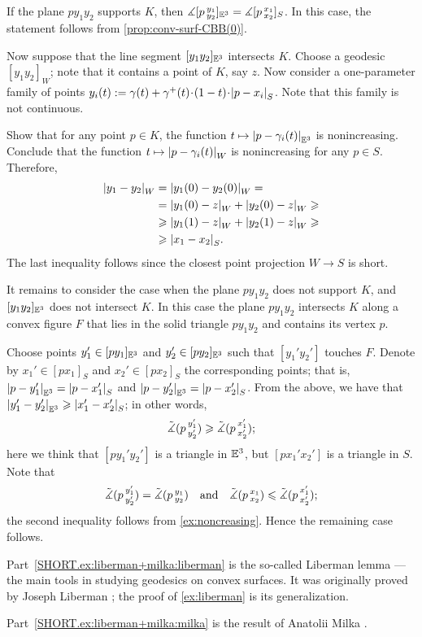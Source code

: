 If the plane $py_1y_2$ supports $K$, then 
$\measuredangle[p\,{}^{y_1}_{y_2}]_{\mathbb{E}^3}=\measuredangle[p\,{}^{x_1}_{x_2}]_S$.
In this case, the statement follows from \ref{prop:conv-surf-CBB(0)}.

Now suppose that the line segment $[y_1y_2]_{\mathbb{E}^3}$ intersects $K$.
Choose a geodesic $[y_1y_2]_W$;
note that it contains a point of $K$, say $z$.
Now consider a one-parameter family of points 
$y_i(t)\df \gamma(t)+\gamma^+(t)\cdot (1-t)\cdot \dist{p}{x_i}{S}$.
Note that this family is not continuous.

Show that for any point $p\in K$, the function $t\mapsto |{p}-{\gamma_i(t)}|_{\mathbb{E}^3}^{{}}$ is nonincreasing.
Conclude that the function $t\mapsto |{p}-{\gamma_i(t)}|_{W}^{{}}$ is nonincreasing for any $p\in S$.
Therefore, 
\begin{align*}
|{y_1}-{y_2}|_{W}^{{}}
&=|{y_1(0)}-{y_2(0)}|_{W}^{{}}=
\\
&=|{y_1(0)}-{z}|_{W}^{{}}+|{y_2(0)}-{z}|_{W}^{{}}\geqslant
\\
&\geqslant|{y_1(1)}-{z}|_{W}^{{}}+|{y_2(1)}-{z}|_{W}^{{}}\geqslant 
\\
&\geqslant|{x_1}-{x_2}|_{S}^{{}}.
\end{align*}
The last inequality follows since the closest point projection $W\to S$ is short.

It remains to consider the case when the plane $py_1y_2$ does not support $K$,
and $[y_1y_2]_{\mathbb{E}^3}$ does not intersect $K$.
In this case the plane $py_1y_2$ intersects $K$ along a convex figure $F$ that lies in the solid triangle 
$py_1y_2$ and contains its vertex $p$.

Choose points $y_1'\in [py_1]_{\mathbb{E}^3}$ and $y_2'\in [py_2]_{\mathbb{E}^3}$ such that $[y_1'y_2']$ touches $F$.
Denote by $x_1'\in [px_1]_{S}$ and $x_2'\in [px_2]_{S}$ the corresponding points;
that is, $|{p}-{y_1'}|_{\mathbb{E}^3}^{{}}=|{p}-{x_1'}|_{S}^{{}}$ and $|{p}-{y_2'}|_{\mathbb{E}^3}^{{}}=|{p}-{x_2'}|_{S}^{{}}$.
From the above, we have that $|{y_1'}-{y_2'}|_{\mathbb{E}^3}^{{}}\geqslant|{x_1'}-{x_2'}|_{S}^{{}}$;
in other words, 
\[\tilde\measuredangle(p\,{}^{y_1'}_{y_2'})\geqslant \tilde\measuredangle(p\,{}^{x_1'}_{x_2'});\]
here we think that $[p{y_1'}{y_2'}]$ is a triangle in $\mathbb{E}^3$, but $[p{x_1'}{x_2'}]$ is a triangle in $S$.
Note that 
\[\tilde\measuredangle(p\,{}^{y_1'}_{y_2'})=\tilde\measuredangle(p\,{}^{y_1}_{y_2})
\quad\text{and}\quad
\tilde\measuredangle(p\,{}^{x_1}_{x_2})\leqslant \tilde\measuredangle(p\,{}^{x_1'}_{x_2'});
\]
the second inequality follows from \ref{ex:noncreasing}.
Hence the remaining case follows.

Part~\ref{SHORT.ex:liberman+milka:liberman} is the so-called Liberman lemma --- the main tools in studying geodesics on convex surfaces.
It was originally proved by Joseph Liberman \cite{liberman}; the proof of \ref{ex:liberman} is its generalization. 

Part~\ref{SHORT.ex:liberman+milka:milka} is the result of Anatolii Milka \cite[Theorem 2]{milka1982}.

